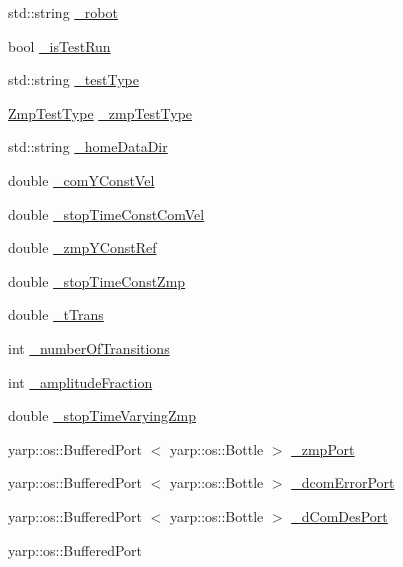 \begin{DoxyCompactItemize}
\item 
std\-::string \hyperlink{classWalkingClient_a67461634d7e8cb0234400b34fd2865e7}{\-\_\-robot}
\item 
bool \hyperlink{classWalkingClient_a4f9c8688537ddd8a487a212fbb279a9b}{\-\_\-is\-Test\-Run}
\item 
std\-::string \hyperlink{classWalkingClient_a35c00feb4e7dfa532e43241e855fec89}{\-\_\-test\-Type}
\item 
\hyperlink{WalkingClient_8h_afc01479a47f5a87462a54b6a9e11fffa}{\-Zmp\-Test\-Type} \hyperlink{classWalkingClient_a14576258d7fed1b36919145f1b56d74c}{\-\_\-zmp\-Test\-Type}
\item 
std\-::string \hyperlink{classWalkingClient_ade3bf018661152fc0404d3973ea30783}{\-\_\-home\-Data\-Dir}
\item 
double \hyperlink{classWalkingClient_a4e448bc147b41d97e0f17af6ebb0020f}{\-\_\-com\-Y\-Const\-Vel}
\item 
double \hyperlink{classWalkingClient_a9f19b1a1184cbdbf883cc374c6b6b88f}{\-\_\-stop\-Time\-Const\-Com\-Vel}
\item 
double \hyperlink{classWalkingClient_a6cba3194816a0be78a8b17d539806115}{\-\_\-zmp\-Y\-Const\-Ref}
\item 
double \hyperlink{classWalkingClient_a58b08317f6d8b825a21e1db8c7f0ff32}{\-\_\-stop\-Time\-Const\-Zmp}
\item 
double \hyperlink{classWalkingClient_a144518766ec4eb9eeab230fcb291e20c}{\-\_\-t\-Trans}
\item 
int \hyperlink{classWalkingClient_aefb4ed994a32879a526f2bc8c962927f}{\-\_\-number\-Of\-Transitions}
\item 
int \hyperlink{classWalkingClient_ac548ce03ea9ceffb4b42981942f66dd0}{\-\_\-amplitude\-Fraction}
\item 
double \hyperlink{classWalkingClient_a2ed3837afa0c366f1cdef16b2a99b761}{\-\_\-stop\-Time\-Varying\-Zmp}
\item 
yarp\-::os\-::\-Buffered\-Port\*
$<$ yarp\-::os\-::\-Bottle $>$ \hyperlink{classWalkingClient_af2e0817fa94ca802775addd22b09bf7a}{\-\_\-zmp\-Port}
\item 
yarp\-::os\-::\-Buffered\-Port\*
$<$ yarp\-::os\-::\-Bottle $>$ \hyperlink{classWalkingClient_a1b01264c9d9d403a68a149d86d1bc53f}{\-\_\-dcom\-Error\-Port}
\item 
yarp\-::os\-::\-Buffered\-Port\*
$<$ yarp\-::os\-::\-Bottle $>$ \hyperlink{classWalkingClient_a17369473b4fe2ff0eaecc7d41a8430c7}{\-\_\-d\-Com\-Des\-Port}
\item 
yarp\-::os\-::\-Buffered\-Port\*

\end{DoxyCompactItemize}
